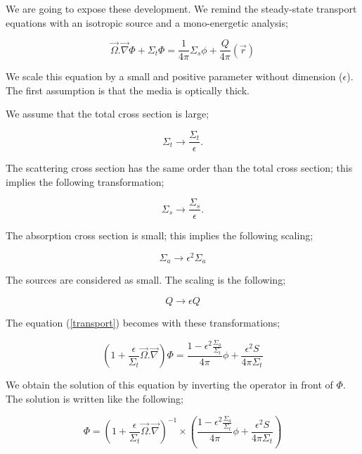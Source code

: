 \documentclass[a4paper, 12pt]{report}
\begin{document}
\begin{appendix}
We are going to expose these development. We remind the steady-state transport equations with an isotropic source and a mono-energetic analysis;

\begin{equation}\label{transport}
\vec{\Omega}. \vec{\nabla} \Phi + \Sigma_t \Phi = \frac{1}{4\pi}  \Sigma_s \phi +\frac{Q}{4\pi}(\vec{r}) 
\end{equation}

We scale this equation by a small and positive parameter without dimension ($\epsilon$). The first assumption is that the media is optically thick.

We assume that the total cross section is large;

\begin{equation}
\Sigma_t \rightarrow \frac{\Sigma_t}{\epsilon}.
\end{equation}

The scattering cross section has the same order than the total cross section; this implies the following transformation;

\begin{equation}
\Sigma_s \rightarrow \frac{\Sigma_s}{\epsilon}.
\end{equation}

The absorption cross section is small; this implies the following scaling;

\begin{equation}
\Sigma_a \rightarrow \epsilon^2 \Sigma_a
\end{equation}

The sources are considered as small. The scaling is the following;

\begin{equation}
Q \rightarrow \epsilon Q
\end{equation}

The equation (\ref{transport}) becomes with these transformations;

\begin{equation}
\left( 1 + \frac{\epsilon}{\Sigma_t} \vec{\Omega}.\vec{\nabla}\right)\Phi = \frac{1-\epsilon^2\frac{\Sigma_a}{\Sigma_t}}{4\pi}\phi + \frac{\epsilon^2S}{4\pi \Sigma_t}
\end{equation}

We obtain the solution of this equation by inverting the operator in front of $\Phi$. The solution is written like the following;

\begin{equation}
\Phi = \left( 1 + \frac{\epsilon}{\Sigma_t} \vec{\Omega}.\vec{\nabla}\right)^{-1} \times \left(\frac{1-\epsilon^2\frac{\Sigma_a}{\Sigma_t}}{4\pi}\phi + \frac{\epsilon^2S}{4\pi \Sigma_t}\right)
\end{equation}


\end{appendix}
\end{document}
